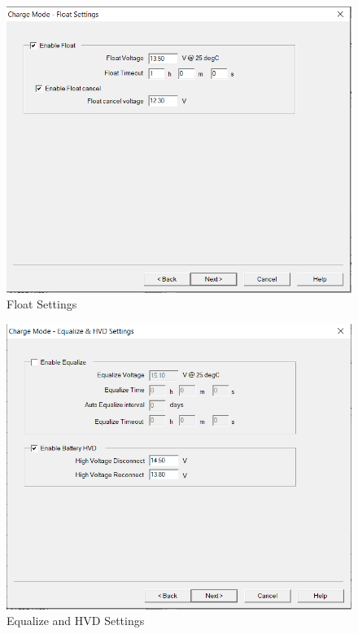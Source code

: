 \begin{figure}[!htb]
	\includegraphics[width=\textwidth,height=\textwidth,scale=0.5]{./graphics/tsmppt_troubleshooting/ms_7.png}
	\caption{\label{fig:settings-2} Float Settings}
	
\end{figure}
\begin{figure}[!htb]
	\includegraphics[width=\textwidth,height=\textwidth]{./graphics/tsmppt_troubleshooting/ms_8.png}
	\caption{\label{fig:settings-3} Equalize and HVD Settings}
\end{figure}
